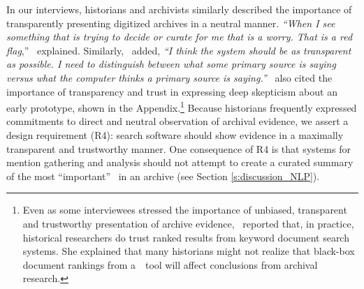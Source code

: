 In our interviews, historians and archivists similarly described the importance of transparently presenting digitized archives in a neutral manner. \textit{``When I see something that is trying to decide or curate for me that is a worry. That is a red flag},'' \ifour~explained. Similarly, \itwo~added, \textit{``I think the system should be as transparent as possible. I need to distinguish between what some primary source is saying versus what the computer thinks a primary source is saying.''}  \ifive~also cited the importance of transparency and trust in expressing deep skepticism about an early prototype, shown in the Appendix.\footnote{Even as some interviewees stressed the importance of unbiased, transparent and trustworthy presentation of archive evidence, \ithree~reported that, in practice, historical researchers do trust ranked results from keyword document search systems. She explained that many historians might not realize that black-box document rankings from a~\Baselongname~tool will affect conclusions from archival research.}
Because historians frequently expressed commitments to direct and neutral observation of archival evidence, we assert a design requirement {(R4): search software should show evidence in a maximally transparent and trustworthy manner.}
One consequence of R4 is that systems for mention gathering and analysis should not attempt to create a curated summary of the most ``important'' \mentions~in an archive (see Section \ref{s:discussion_NLP}).

